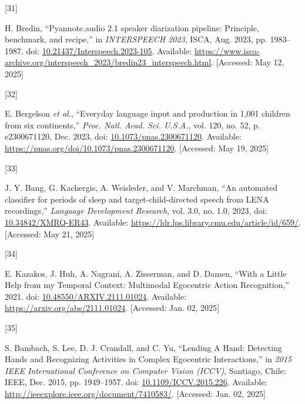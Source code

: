 \documentclass[
  man,floatsintext]{apa6}
\newlength{\cslhangindent}
\newlength{\csllabelwidth}
\newenvironment{CSLReferences}[2] %
 {\begin{list}{}{%
  \setlength{\itemindent}{0pt}
  \setlength{\leftmargin}{0pt}
  \setlength{\parsep}{0pt}
  \ifodd #1
   \setlength{\leftmargin}{\cslhangindent}
   \setlength{\itemindent}{-1\cslhangindent}
  \fi
  \setlength{\itemsep}{#2\baselineskip}}}
 {\end{list}}
\newcommand{\CSLLeftMargin}[1]{\parbox[t]{\csllabelwidth}{\strut#1\strut}}
\newcommand{\CSLRightInline}[1]{\parbox[t]{\linewidth - \csllabelwidth}{\strut#1\strut}}
\begin{document}
\begin{CSLReferences}{0}{0}
\CSLLeftMargin{{[}31{]} }%
\CSLRightInline{H. Bredin, {``Pyannote.audio 2.1 speaker diarization pipeline: Principle, benchmark, and recipe,''} in \emph{{INTERSPEECH} 2023}, ISCA, Aug. 2023, pp. 1983--1987. doi: \href{https://doi.org/10.21437/Interspeech.2023-105}{10.21437/Interspeech.2023-105}. Available: \url{https://www.isca-archive.org/interspeech_2023/bredin23_interspeech.html}. {[}Accessed: May 12, 2025{]}}

\CSLLeftMargin{{[}32{]} }%
\CSLRightInline{E. Bergelson \emph{et al.}, {``Everyday language input and production in 1,001 children from six continents,''} \emph{Proc. Natl. Acad. Sci. U.S.A.}, vol. 120, no. 52, p. e2300671120, Dec. 2023, doi: \href{https://doi.org/10.1073/pnas.2300671120}{10.1073/pnas.2300671120}. Available: \url{https://pnas.org/doi/10.1073/pnas.2300671120}. {[}Accessed: May 19, 2025{]}}

\CSLLeftMargin{{[}33{]} }%
\CSLRightInline{J. Y. Bang, G. Kachergis, A. Weisleder, and V. Marchman, {``An automated classifier for periods of sleep and target-child-directed speech from {LENA} recordings,''} \emph{Language Development Research}, vol. 3.0, no. 1.0, 2023, doi: \href{https://doi.org/10.34842/XMRQ-ER43}{10.34842/XMRQ-ER43}. Available: \url{https://ldr.lps.library.cmu.edu/article/id/659/}. {[}Accessed: May 21, 2025{]}}

\CSLLeftMargin{{[}34{]} }%
\CSLRightInline{E. Kazakos, J. Huh, A. Nagrani, A. Zisserman, and D. Damen, {``With a {Little Help} from my {Temporal Context}: {Multimodal Egocentric Action Recognition},''} 2021. doi: \href{https://doi.org/10.48550/ARXIV.2111.01024}{10.48550/ARXIV.2111.01024}. Available: \url{https://arxiv.org/abs/2111.01024}. {[}Accessed: Jan. 02, 2025{]}}

\CSLLeftMargin{{[}35{]} }%
\CSLRightInline{S. Bambach, S. Lee, D. J. Crandall, and C. Yu, {``Lending {A Hand}: {Detecting Hands} and {Recognizing Activities} in {Complex Egocentric Interactions},''} in \emph{2015 {IEEE International Conference} on {Computer Vision} ({ICCV})}, Santiago, Chile: IEEE, Dec. 2015, pp. 1949--1957. doi: \href{https://doi.org/10.1109/ICCV.2015.226}{10.1109/ICCV.2015.226}. Available: \url{http://ieeexplore.ieee.org/document/7410583/}. {[}Accessed: Jan. 02, 2025{]}}


\end{CSLReferences}
\end{document}
